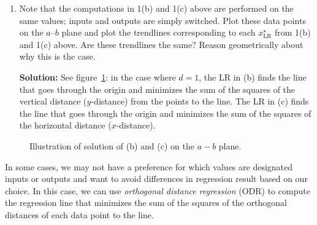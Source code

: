\documentclass[10pt]{article}
\begin{document}
\begin{enumerate}[label=(\alph*)]
\textbf{Solution:}
\begin{align}
A^\top A &= \begin{bmatrix} -1 & -1 & 2 \end{bmatrix} \begin{bmatrix} -1 \\ -1 \\ 2 \end{bmatrix} = 6 \\
x^\star_{\text{LR}} &= (A^\top A)^{-1} A^\top \vec{b} \\
&= \frac{1}{6} A^\top \vec{b} \\
&= \frac{1}{6} \begin{bmatrix} -1 & -1 & 2 \end{bmatrix} \begin{bmatrix} -1 \\ 0 \\ 1 \end{bmatrix} \\
&= \frac{3}{6} = \frac{1}{2}.
\end{align}

\item Note that the computations in 1(b) and 1(c) above are performed on the same values; inputs and outputs are simply switched. Plot these data points on the $a$--$b$ plane and plot the trendlines corresponding to each $x^\star_{\text{LR}}$ from 1(b) and 1(c) above. Are these trendlines the same? Reason geometrically about why this is the case.

\textbf{Solution:} See figure~\ref{fig:lr_plot}: in the case where $d = 1$, the LR in (b) finds the line that goes through the origin and minimizes the sum of the squares of the vertical distance ($y$-distance) from the points to the line. The LR in (c) finds the line that goes through the origin and minimizes the sum of the squares of the horizontal distance ($x$-distance).
\end{enumerate}

\begin{figure}[ht]
\centering
{}
\caption{Illustration of solution of (b) and (c) on the $a - b$ plane.}
\label{fig:lr_plot}
\end{figure}

\bigskip

In some cases, we may not have a preference for which values are designated inputs or outputs and want to avoid differences in regression result based on our choice. In this case, we can use \textit{orthogonal distance regression} (ODR) to compute the regression line that minimizes the sum of the squares of the orthogonal distances of each data point to the line.
\end{document}
